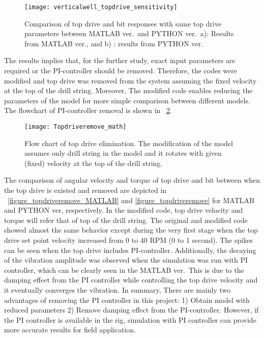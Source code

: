 \begin{figure}[!hbt]
  \centering
  \texttt{[image: verticalwell\_topdrive\_sensitivity]}
  \caption[Comparison of drillstring response to same top drive parameters]{Comparison of top drive and bit responses with same top drive parameters between MATLAB ver.\ and PYTHON ver.\ a): Results from MATLAB ver., and b) : results from PYTHON ver.}\label{figure_topdrive_sensitivity}
\end{figure}

The results implies that, for the further study, exact input parameters are required or the PI-controller should be removed. Therefore, the codes were modified and top drive was removed from the system assuming the fixed velocity at the top of the drill string. Moreover, The modified code enables reducing the parameters of the model for more simple comparison between different models. The flowchart of PI-controller removal is shown in \figurename~\ref{figure_Topdriveremove_math}. 

\begin{figure}[!hbt]
  \centering
  \texttt{[image: Topdriveremove\_math]}
  \caption[flow chart of top drive elimination]{Flow chart of top drive elimination. The modification of the model assumes only drill string in the model and it rotates with given (fixed) velocity at the top of the drill string.}\label{figure_Topdriveremove_math}
\end{figure}

The comparison of angular velocity and torque of top drive and bit between when the top drive is existed and removed are depicted in \figurename~\ref{figure_topdriveremove_MATLAB} and \ref{figure_topdriveremove} for MATLAB and PYTHON ver, respectively. In the modified code, top drive velocity and torque will refer that of top of the drill string. The original and modified code showed almost the same behavior except during the very first stage when the top drive set point velocity increased from 0 to 40 RPM (0 to 1 second). The spikes can be seen when the top drive includes PI-controller. Additionally, the decaying of the vibration amplitude was observed when the simulation was run with PI controller, which can be clearly seen in the MATLAB ver.\ This is due to the damping effect from the PI controller while controlling the top drive velocity and it eventually converges the vibration. In summary, There are mainly two advantages of removing the PI controller in this project: 1) Obtain model with reduced parameters 2) Remove damping effect from the PI-controller. However, if the PI controller is available in the rig, simulation with PI controller can provide more accurate results for field application.

